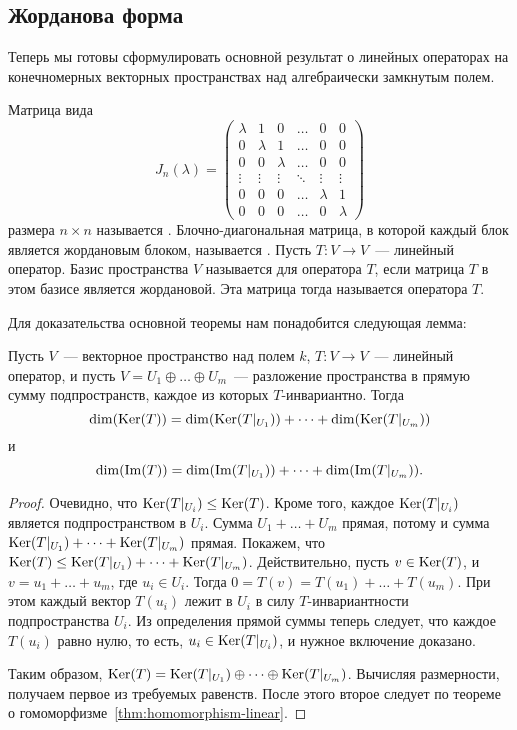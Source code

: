 \subsection{Жорданова форма}


Теперь мы готовы сформулировать основной результат о линейных операторах
на конечномерных векторных пространствах над алгебраически
замкнутым полем.
\begin{definition}
Матрица вида
$$
J_n(\lambda)=
\begin{pmatrix}
\lambda & 1 & 0 & \dots & 0 & 0 \\
0 & \lambda & 1 & \dots & 0 & 0 \\
0 & 0 & \lambda & \dots & 0 & 0 \\
\vdots & \vdots & \vdots & \ddots & \vdots & \vdots \\
0 & 0 & 0 & \dots & \lambda & 1 \\
0 & 0 & 0 & \dots & 0 & \lambda
\end{pmatrix}
$$
размера $n\times n$ называется .
Блочно-диагональная матрица, в которой каждый блок является жордановым блоком,
называется .
Пусть $T\colon V\to V$~--- линейный оператор. Базис пространства $V$
называется  для оператора $T$, если матрица
$T$ в этом базисе является жордановой. Эта матрица тогда называется
 оператора $T$.
\end{definition}

Для доказательства основной теоремы нам понадобится следующая лемма:
\begin{lemma}\label{lemma:dim-ker-for-direct-sum}
Пусть $V$~--- векторное пространство над полем $k$,
$T\colon V\to V$~--- линейный оператор, и
пусть $V = U_1\oplus\dots\oplus U_m$~--- разложение пространства
в прямую сумму подпространств, каждое из которых $T$-инвариантно.
Тогда
$$
\dim(\operatorname{Ker}(T)) = \dim(\operatorname{Ker}(T|_{U_1})) + \dots + \dim(\operatorname{Ker}(T|_{U_m}))
$$
и 
$$
\dim(\operatorname{Im}(T)) = \dim(\operatorname{Im}(T|_{U_1})) + \dots + \dim(\operatorname{Im}(T|_{U_m})).
$$
\end{lemma}
\begin{proof}
Очевидно, что $\operatorname{Ker}(T|_{U_i}) \leq \operatorname{Ker}(T)$. Кроме того, каждое
$\operatorname{Ker}(T|_{U_i})$ является подпространством в $U_i$. Сумма
$U_1 + \dots + U_m$ прямая, потому и сумма
$\operatorname{Ker}(T|_{U_1}) + \dots + \operatorname{Ker}(T|_{U_m})$ прямая.
Покажем, что $\operatorname{Ker}(T) \leq \operatorname{Ker}(T|_{U_1}) + \dots + \operatorname{Ker}(T|_{U_m})$.
Действительно, пусть $v\in\operatorname{Ker}(T)$, и $v = u_1+\dots+u_m$, где $u_i\in U_i$.
Тогда $0 = T(v) = T(u_1) + \dots + T(u_m)$. При этом каждый вектор
$T(u_i)$ лежит в $U_i$ в силу $T$-инвариантности подпространства $U_i$.
Из определения прямой суммы теперь следует, что каждое $T(u_i)$ равно нулю,
то есть, $u_i\in\operatorname{Ker}(T|_{U_i})$, и нужное включение доказано.

Таким образом, $\operatorname{Ker}(T) = \operatorname{Ker}(T|_{U_1})\oplus\dots\oplus\operatorname{Ker}(T|_{U_m})$.
Вычисляя размерности, получаем первое из требуемых равенств.
После этого второе следует по теореме
о гомоморфизме~\ref{thm:homomorphism-linear}.
\end{proof}

